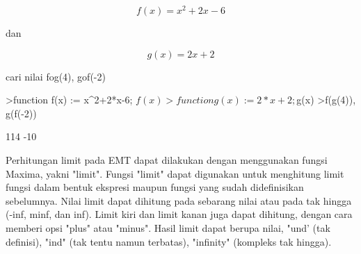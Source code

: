 \documentclass{article}
\begin{document}
\begin{eulernotebook}
\begin{eulercomment}
\begin{eulercomment}
\begin{eulercomment}
\begin{eulercomment}
\begin{eulercomment}
\begin{eulercomment}
\begin{eulercomment}
\end{eulercomment}
\begin{eulerformula}
\[
f(x)=x^2+2x-6
\]
\end{eulerformula}
\begin{eulercomment}
dan\\
\end{eulercomment}
\begin{eulerformula}
\[
g(x)=2x+2
\]
\end{eulerformula}
\begin{eulercomment}
cari nilai fog(4), gof(-2)
\end{eulercomment}
\begin{eulerprompt}
>function f(x) := x^2+2*x-6; $f(x)
>function g(x) := 2*x+2; $g(x)
>f(g(4)), g(f(-2))
\end{eulerprompt}
\begin{euleroutput}
  114
  -10
\end{euleroutput}
\begin{eulercomment}
Perhitungan limit pada EMT dapat dilakukan dengan menggunakan fungsi
Maxima, yakni "limit". Fungsi "limit" dapat digunakan untuk menghitung
limit fungsi dalam bentuk ekspresi maupun fungsi yang sudah
didefinisikan sebelumnya. Nilai limit dapat dihitung pada sebarang
nilai atau pada tak hingga (-inf, minf, dan inf). Limit kiri dan limit
kanan juga dapat dihitung, dengan cara memberi opsi "plus" atau
"minus". Hasil limit dapat berupa nilai, "und’ (tak definisi), "ind"
(tak tentu namun terbatas), "infinity" (kompleks tak hingga).


\end{eulercomment}
\end{eulercomment}
\end{eulercomment}
\end{eulercomment}
\end{eulercomment}
\end{eulercomment}
\end{eulercomment}
\end{eulernotebook}
\end{document}
